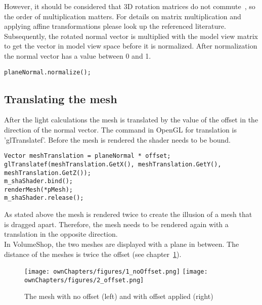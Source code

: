 \newline
However, it should be considered that 3D rotation matrices do not commute~\cite{book:computerGraphicsHill}, so the order of multiplication matters. For details on matrix multiplication and applying affine transformations please look up the referenced literature\cite{book:computerGraphicsHearn}\cite{book:computerGraphicsHill}.
\newline
Subsequently, the rotated normal vector is multiplied with the model view matrix to get the vector in model view space before it is normalized. After normalization the normal vector has a value between 0 and 1.
\begin{lstlisting}
planeNormal.normalize();
\end{lstlisting}

\subsection{Translating the mesh}
After the light calculations the mesh is translated by the value of the offset in the direction of the normal vector. The command in OpenGL for translation is 'glTranslatef'. Before the mesh is rendered the shader needs to be bound.
\begin{lstlisting}
Vector meshTranslation = planeNormal * offset;
glTranslatef(meshTranslation.GetX(), meshTranslation.GetY(), meshTranslation.GetZ());
m_shaShader.bind();
renderMesh(*pMesh);
m_shaShader.release();
\end{lstlisting}
As stated above the mesh is rendered twice to create the illusion of a mesh that is dragged apart. Therefore, the mesh needs to be rendered again with a translation in the opposite direction.\\
In VolumeShop, the two meshes are displayed with a plane in between. The distance of the meshes is twice the offset (see chapter~\ref{fig:offset}).

\begin{figure}%
\centering
\texttt{[image: ownChapters/figures/1\_noOffset.png]}%
\hspace{7.00mm}
\texttt{[image: ownChapters/figures/2\_offset.png]}%
\caption{The mesh with no offset (left) and with offset applied (right)}%
\label{fig:offset}%
\end{figure}


